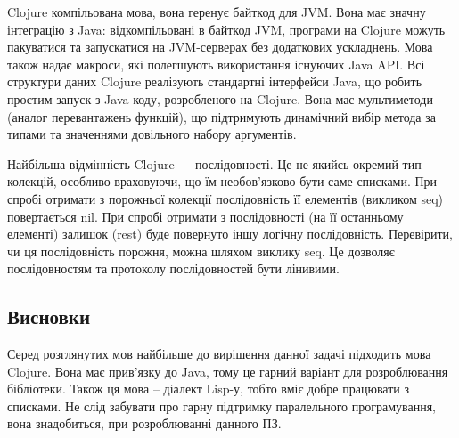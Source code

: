 
Clojure компільована мова, вона геренує байткод для  JVM. Вона має значну інтеграцію з Java: відкомпільовані в байткод JVM, програми на Clojure можуть пакуватися та запускатися на JVM-серверах без додаткових ускладнень. Мова також надає макроси, які полегшують використання існуючих Java API. Всі структури даних Clojure реалізують стандартні інтерфейси Java, що робить простим запуск з Java коду, розробленого на Clojure. Вона має мультиметоди (аналог перевантажень функцій), що підтримують динамічний вибір метода за типами та значеннями довільного набору аргументів.


Найбільша відмінність Clojure — послідовності. Це не якийсь окремий тип колекцій, особливо враховуючи, що їм необов'язково бути саме списками. При спробі отримати з порожньої колекції послідовність її елементів (викликом seq) повертається nil. При спробі отримати з послідовності (на її останньому елементі) залишок (rest) буде повернуто іншу логічну послідовність. Перевірити, чи ця послідовність порожня, можна шляхом виклику seq. Це дозволяє послідовностям та протоколу послідовностей бути лінивими.

\subsection{Висновки}
Серед розглянутих мов найбільше до вирішення данної задачі підходить мова Clojure. Вона має прив'язку до Java, тому це гарний варіант для розроблювання бібліотеки. Також ця мова -- діалект Lisp-у, тобто вміє добре працювати з списками. Не слід забувати про гарну підтримку паралельного програмування, вона знадобиться, при розроблюванні данного ПЗ.
